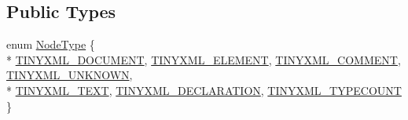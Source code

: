 \subsection*{Public Types}
\begin{DoxyCompactItemize}
\item 
enum \hyperlink{class_ti_xml_node_a836eded4920ab9e9ef28496f48cd95a2}{Node\+Type} \{ \\*
\hyperlink{class_ti_xml_node_a836eded4920ab9e9ef28496f48cd95a2a76c4c520453398cd033e8b97ec9a0b04}{T\+I\+N\+Y\+X\+M\+L\+\_\+\+D\+O\+C\+U\+M\+E\+NT}, 
\hyperlink{class_ti_xml_node_a836eded4920ab9e9ef28496f48cd95a2a9ad167b17c3148d7a018fde9a41ce976}{T\+I\+N\+Y\+X\+M\+L\+\_\+\+E\+L\+E\+M\+E\+NT}, 
\hyperlink{class_ti_xml_node_a836eded4920ab9e9ef28496f48cd95a2a742eb78855db1e81614848072de03721}{T\+I\+N\+Y\+X\+M\+L\+\_\+\+C\+O\+M\+M\+E\+NT}, 
\hyperlink{class_ti_xml_node_a836eded4920ab9e9ef28496f48cd95a2a7376f9420c8ab507842c8a0813bb077e}{T\+I\+N\+Y\+X\+M\+L\+\_\+\+U\+N\+K\+N\+O\+WN}, 
\\*
\hyperlink{class_ti_xml_node_a836eded4920ab9e9ef28496f48cd95a2aa6177e9506461cdca7062559387a2714}{T\+I\+N\+Y\+X\+M\+L\+\_\+\+T\+E\+XT}, 
\hyperlink{class_ti_xml_node_a836eded4920ab9e9ef28496f48cd95a2a1e2351ad8cd0c805538d94222f3d8cd0}{T\+I\+N\+Y\+X\+M\+L\+\_\+\+D\+E\+C\+L\+A\+R\+A\+T\+I\+ON}, 
\hyperlink{class_ti_xml_node_a836eded4920ab9e9ef28496f48cd95a2a878567737ed539bd3de6a941027e9309}{T\+I\+N\+Y\+X\+M\+L\+\_\+\+T\+Y\+P\+E\+C\+O\+U\+NT}
 \}
\end{DoxyCompactItemize}
